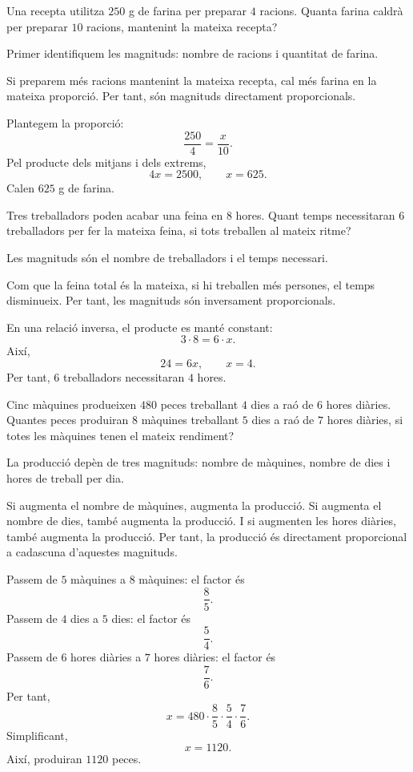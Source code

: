 \begin{exercici}
	Una recepta utilitza \(250\) g de farina per preparar \(4\) racions. Quanta farina caldrà per preparar \(10\) racions, mantenint la mateixa recepta?
\end{exercici}

\begin{solucio}
	Primer identifiquem les magnituds: nombre de racions i quantitat de farina.

	Si preparem més racions mantenint la mateixa recepta, cal més farina en la mateixa proporció. Per tant, són magnituds directament proporcionals.

	Plantegem la proporció:
	\[
		\frac{250}{4}=\frac{x}{10}.
	\]
	Pel producte dels mitjans i dels extrems,
	\[
		4x=2500,
		\qquad
		x=625.
	\]
	Calen \(625\) g de farina.
\end{solucio}

\begin{exercici}
	Tres treballadors poden acabar una feina en \(8\) hores. Quant temps necessitaran \(6\) treballadors per fer la mateixa feina, si tots treballen al mateix ritme?
\end{exercici}

\begin{solucio}
	Les magnituds són el nombre de treballadors i el temps necessari.

	Com que la feina total és la mateixa, si hi treballen més persones, el temps disminueix. Per tant, les magnituds són inversament proporcionals.

	En una relació inversa, el producte es manté constant:
	\[
		3\cdot 8=6\cdot x.
	\]
	Així,
	\[
		24=6x,
		\qquad
		x=4.
	\]
	Per tant, \(6\) treballadors necessitaran \(4\) hores.
\end{solucio}

\begin{exercici}
	Cinc màquines produeixen \(480\) peces treballant \(4\) dies a raó de \(6\) hores diàries. Quantes peces produiran \(8\) màquines treballant \(5\) dies a raó de \(7\) hores diàries, si totes les màquines tenen el mateix rendiment?
\end{exercici}

\begin{solucio}
	La producció depèn de tres magnituds: nombre de màquines, nombre de dies i hores de treball per dia.

	Si augmenta el nombre de màquines, augmenta la producció. Si augmenta el nombre de dies, també augmenta la producció. I si augmenten les hores diàries, també augmenta la producció. Per tant, la producció és directament proporcional a cadascuna d'aquestes magnituds.

	Passem de \(5\) màquines a \(8\) màquines: el factor és
	\[
		\frac{8}{5}.
	\]
	Passem de \(4\) dies a \(5\) dies: el factor és
	\[
		\frac{5}{4}.
	\]
	Passem de \(6\) hores diàries a \(7\) hores diàries: el factor és
	\[
		\frac{7}{6}.
	\]
	Per tant,
	\[
		x=480\cdot\frac{8}{5}\cdot\frac{5}{4}\cdot\frac{7}{6}.
	\]
	Simplificant,
	\[
		x=1120.
	\]
	Així, produiran \(1120\) peces.
\end{solucio}

